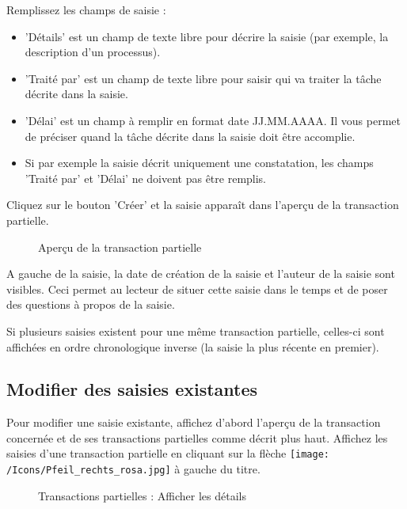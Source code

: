 Remplissez les champs de saisie :

\begin{itemize}
\item
'Détails'  est un champ de texte libre pour décrire la saisie (par exemple, la description d'un processus).
\item
'Traité par'  est un champ de texte libre pour saisir qui va traiter la tâche décrite dans la saisie.
\item
'Délai'  est un champ à remplir en format date JJ.MM.AAAA. Il vous permet de préciser quand la tâche décrite dans la saisie doit être accomplie.
\item
Si par exemple la saisie décrit uniquement une constatation, les champs 'Traité par' et 'Délai' ne doivent pas être remplis.
\end{itemize}

Cliquez sur le bouton 'Créer'  et la saisie apparaît dans l'aperçu de la transaction partielle.

\begin{figure}[H]
\caption{Aperçu de la transaction partielle}
\end{figure}

A gauche de la saisie, la date de création de la saisie et l'auteur de la saisie  sont visibles. Ceci permet au lecteur de situer cette saisie dans le temps et de poser des questions à propos de la saisie.

Si plusieurs saisies existent pour une même transaction partielle, celles-ci sont affichées en ordre chronologique inverse (la saisie la plus récente en premier).

\subsection{Modifier des saisies existantes}

Pour modifier une saisie existante, affichez d'abord l'aperçu de la transaction concernée et de ses transactions partielles comme décrit plus haut. Affichez les saisies d'une transaction partielle en cliquant sur la flèche \texttt{[image: /Icons/Pfeil\_rechts\_rosa.jpg]} à gauche du titre.
	
\begin{figure}[H]
\caption{Transactions partielles : Afficher les détails}
\end{figure}

